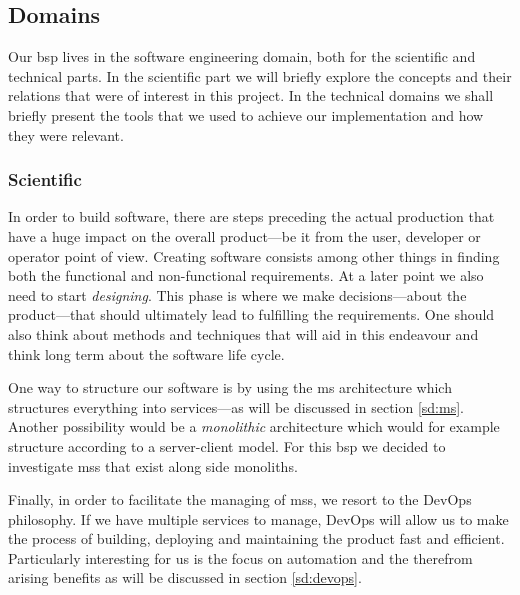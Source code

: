 \subsection{Domains}


Our \gls{bsp} lives in the software engineering domain, both for the
scientific and technical parts. In the scientific part we will briefly
explore the concepts and their relations that were of interest in this
project. In the technical domains we shall briefly present the tools
that we used to achieve our implementation and how they were relevant.

\subsubsection{Scientific}


In order to build software, there are steps preceding the actual
production that have a huge impact on the overall product---be it from
the user, developer or operator point of view. Creating software
consists among other things in finding both the functional and
non-functional requirements. At a later point we also need to start
\textit{designing}. This phase is where we make decisions---about the
product---that should ultimately lead to fulfilling the requirements.
One should also think about methods and techniques that will aid in
this endeavour and think long term about the software life cycle.

One way to structure our software is by using the \gls{ms}
architecture which structures everything into services---as will be
discussed in section \vref{sd:ms}. Another possibility would be a
\textit{monolithic} architecture which would for example structure
according to a server-client model. For this \gls{bsp} we decided to
investigate \glspl{ms} that exist along side monoliths.

Finally, in order to facilitate the managing of \glspl{ms}, we resort
to the DevOps philosophy.\cite{devops-culture} If we have multiple
services to manage, DevOps will allow us to make the process of
building, deploying and maintaining the product fast and efficient.
Particularly interesting for us is the focus on automation and the
therefrom arising benefits as will be discussed in section
\vref{sd:devops}.

